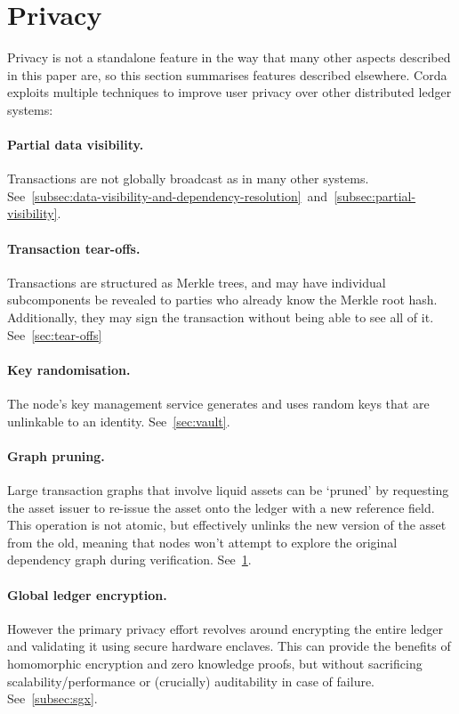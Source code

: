 \documentclass{article}
\begin{document}
\section{Privacy}\label{sec:privacy}

Privacy is not a standalone feature in the way that many other aspects described in this paper are, so this section
summarises features described elsewhere. Corda exploits multiple techniques to improve user privacy over other
distributed ledger systems:

\paragraph{Partial data visibility.}Transactions are not globally broadcast as in many other systems.
See~\cref{subsec:data-visibility-and-dependency-resolution}~and~\cref{subsec:partial-visibility}.

\paragraph{Transaction tear-offs.}Transactions are structured as Merkle trees, and may have individual
subcomponents be revealed to parties who already know the Merkle root hash. Additionally, they may sign the
transaction without being able to see all of it. See~\cref{sec:tear-offs}

\paragraph{Key randomisation.}The node's key management service generates and uses random keys that are unlinkable to an identity.
See~\cref{sec:vault}.

\paragraph{Graph pruning.}Large transaction graphs that involve liquid assets can be `pruned' by requesting the asset
issuer to re-issue the asset onto the ledger with a new reference field. This operation is not atomic, but effectively
unlinks the new version of the asset from the old, meaning that nodes won't attempt to explore the original dependency
graph during verification. See~\cref{sec:privacy}.

\paragraph{Global ledger encryption.} However the primary privacy effort revolves around encrypting the entire
ledger and validating it using secure hardware enclaves. This can provide the benefits of homomorphic encryption
and zero knowledge proofs, but without sacrificing scalability/performance or (crucially) auditability in case of
failure. See~\cref{subsec:sgx}.
\end{document}
